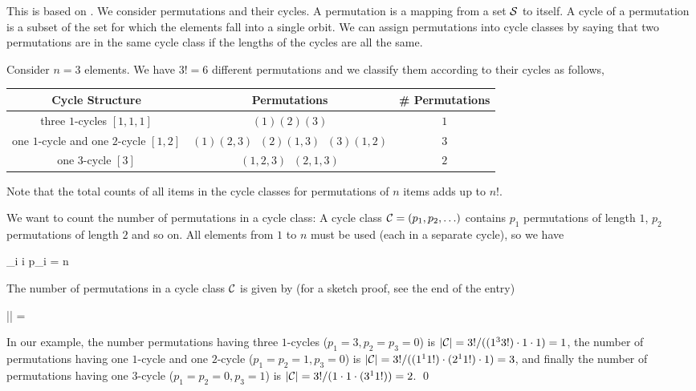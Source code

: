 
This is based on \cite{Dominus2007}. We consider permutations and their cycles. A permutation is a mapping from a set $\mathcal{S}$ to itself. A cycle of a permutation is a subset of the set for which the elements fall into a single orbit. We can assign permutations into cycle classes by saying that two permutations are in the same cycle class if the lengths of the cycles are all the same.

Consider $n = 3$ elements. We have $3! = 6$ different permutations and we classify them according to their cycles as follows,

\vspace{2mm}

\begin{tabular}{|c|c|c|}
  Cycle Structure & Permutations & \# Permutations \\ \hline
  three $1$-cycles $[1,1,1] $ & $(1)(2)(3)$ & $1$ \\
  one $1$-cycle and one $2$-cycle $[1,2]$ & $(1)(2,3) \;\; (2)(1,3) \;\; (3)(1,2)$ & $3$ \\
  one $3$-cycle $[3]$ & $(1,2,3) \;\; (2,1,3)$ & $2$
\end{tabular}

\vspace{2mm}

Note that the total counts of all items in the cycle classes for permutations of $n$ items adds up to $n!$.

We want to count the number of permutations in a cycle class: A cycle class $\mathcal{C}=(p_1, p_2, \ldots)$ contains $p_1$ permutations of length $1$, $p_2$ permutations of length $2$ and so on. All elements from $1$ to $n$ must be used (each in a separate cycle), so we have

\bee
\sum_i i p_i = n
\eee

The number of permutations in a cycle class $\mathcal{C}$ is given by (for a sketch proof, see the end of the entry)

\be\label{2022-04-25:eq1}
|\Cc| = 
\ee

In our example, the number permutations having three $1$-cycles ($p_1 = 3, p_2=p_3=0$) is $|\mathcal{C}| = 3! / ((1^3 3!) \cdot 1 \cdot 1) = 1$, the number of permutations having one $1$-cycle and one $2$-cycle ($p_1 = p_2 = 1, p_3=0$) is $|\mathcal{C}| = 3! / ((1^1 1!) \cdot (2^1 1!) \cdot 1) = 3$, and finally the number of permutations having one $3$-cycle ($p_1=p_2=0, p_3 = 1$) is $|\mathcal{C}| = 3! / (1 \cdot 1 \cdot (3^1 1!)) = 2$. \qed

